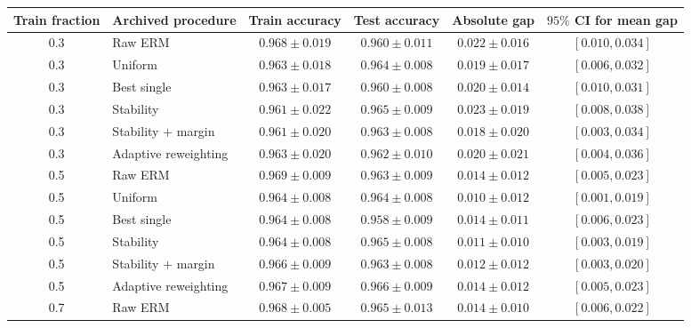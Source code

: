\begin{table}[p]
\centering
\scriptsize
\setlength{\tabcolsep}{4pt}
\renewcommand{\arraystretch}{0.96}
\begin{tabular}{clcccc}
\toprule
Train fraction & Archived procedure & Train accuracy & Test accuracy & Absolute gap & \(95\%\) CI for mean gap \\
\midrule
0.3 & Raw ERM & \(0.968\mathbin{\pm}0.019\) & \(0.960\mathbin{\pm}0.011\) & \(0.022\mathbin{\pm}0.016\) & \([0.010,0.034]\) \\
0.3 & Uniform & \(0.963\mathbin{\pm}0.018\) & \(0.964\mathbin{\pm}0.008\) & \(0.019\mathbin{\pm}0.017\) & \([0.006,0.032]\) \\
0.3 & Best single & \(0.963\mathbin{\pm}0.017\) & \(0.960\mathbin{\pm}0.008\) & \(0.020\mathbin{\pm}0.014\) & \([0.010,0.031]\) \\
0.3 & Stability & \(0.961\mathbin{\pm}0.022\) & \(0.965\mathbin{\pm}0.009\) & \(0.023\mathbin{\pm}0.019\) & \([0.008,0.038]\) \\
0.3 & Stability \(+\) margin & \(0.961\mathbin{\pm}0.020\) & \(0.963\mathbin{\pm}0.008\) & \(0.018\mathbin{\pm}0.020\) & \([0.003,0.034]\) \\
0.3 & Adaptive reweighting & \(0.963\mathbin{\pm}0.020\) & \(0.962\mathbin{\pm}0.010\) & \(0.020\mathbin{\pm}0.021\) & \([0.004,0.036]\) \\
\midrule
0.5 & Raw ERM & \(0.969\mathbin{\pm}0.009\) & \(0.963\mathbin{\pm}0.009\) & \(0.014\mathbin{\pm}0.012\) & \([0.005,0.023]\) \\
0.5 & Uniform & \(0.964\mathbin{\pm}0.008\) & \(0.964\mathbin{\pm}0.008\) & \(0.010\mathbin{\pm}0.012\) & \([0.001,0.019]\) \\
0.5 & Best single & \(0.964\mathbin{\pm}0.008\) & \(0.958\mathbin{\pm}0.009\) & \(0.014\mathbin{\pm}0.011\) & \([0.006,0.023]\) \\
0.5 & Stability & \(0.964\mathbin{\pm}0.008\) & \(0.965\mathbin{\pm}0.008\) & \(0.011\mathbin{\pm}0.010\) & \([0.003,0.019]\) \\
0.5 & Stability \(+\) margin & \(0.966\mathbin{\pm}0.009\) & \(0.963\mathbin{\pm}0.008\) & \(0.012\mathbin{\pm}0.012\) & \([0.003,0.020]\) \\
0.5 & Adaptive reweighting & \(0.967\mathbin{\pm}0.009\) & \(0.966\mathbin{\pm}0.009\) & \(0.014\mathbin{\pm}0.012\) & \([0.005,0.023]\) \\
\midrule
0.7 & Raw ERM & \(0.968\mathbin{\pm}0.005\) & \(0.965\mathbin{\pm}0.013\) & \(0.014\mathbin{\pm}0.010\) & \([0.006,0.022]\) \\

\end{tabular}
\end{table}
